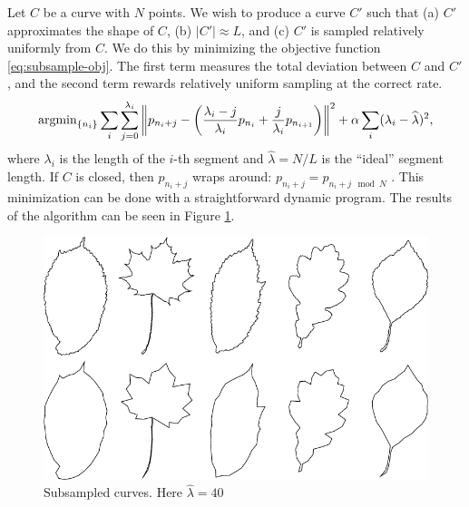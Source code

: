 Let $C$ be a curve with $N$ points. We wish to produce a curve $C'$
such that (a) $C'$ approximates the shape of $C$, (b) $|C'| \approx
L$, and (c) $C'$ is sampled relatively uniformly from $C$. We do this
by minimizing the objective function \eqref{eq:subsample-obj}. The first
term measures the total deviation between $C$ and $C'$, and the second
term rewards relatively uniform sampling at the correct rate.
\begin{equation}
\argmin_{ \{n_i \} } \sum_i \sum_{j=0}^{\lambda_i} \left\| p_{n_i+j} -
  \left( \frac{\lambda_i - j}{\lambda_i} p_{n_i} + \frac{j}{\lambda_i}
    p_{n_{i+1}} \right) \right\|^2 + \alpha \sum_i (\lambda_i -
\widehat{\lambda})^2,\label{eq:subsample-obj}
\end{equation}
where $\lambda_i$ is the length of the $i$-th
segment and $\widehat{\lambda} = N/L$ is the ``ideal'' segment
length. If $C$ is closed, then $p_{n_i + j}$ wraps around: $p_{n_i +
  j} = p_{n_i+j \mod N}$ . This minimization can be done with a
straightforward dynamic program. The results of the algorithm can be
seen in Figure \ref{fig-subsample}.
\begin{figure}[h]
\centering
\includegraphics[width=120mm]{images/subsample.png} 
\caption{Subsampled curves. Here $\widehat{\lambda} = 40$}
\label{fig-subsample}
\end{figure}

